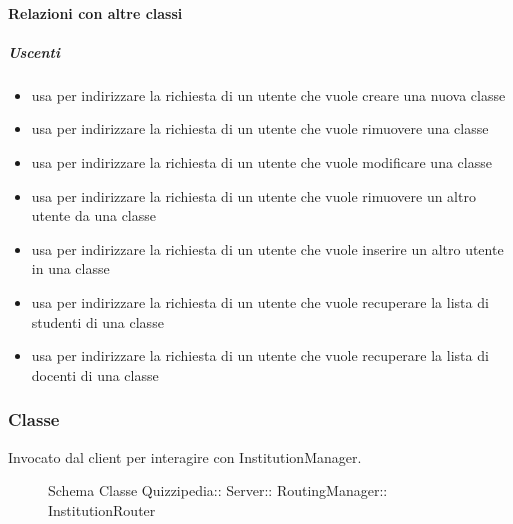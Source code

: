 \paragraph{Relazioni con altre classi}
\subparagraph{Uscenti}
\begin{itemize}
\item usa  per indirizzare la richiesta di un utente che vuole creare una nuova classe
\item usa  per indirizzare la richiesta di un utente che vuole rimuovere una classe
\item usa  per indirizzare la richiesta di un utente che vuole modificare una classe
\item usa  per indirizzare la richiesta di un utente che vuole rimuovere un altro utente da una classe
\item usa  per indirizzare la richiesta di un utente che vuole inserire un altro utente in una classe
\item usa  per indirizzare la richiesta di un utente che vuole recuperare la lista di studenti di una classe
\item usa  per indirizzare la richiesta di un utente che vuole recuperare la lista di docenti di una classe
\end{itemize}
\subsubsection{Classe }
Invocato dal client per interagire con InstitutionManager.
\begin{figure}[H]
\centering
\noindent{}
\caption[Schema Classe InstitutionRouter]{Schema Classe Quizzipedia:: Server:: RoutingManager:: InstitutionRouter}
\end{figure}
